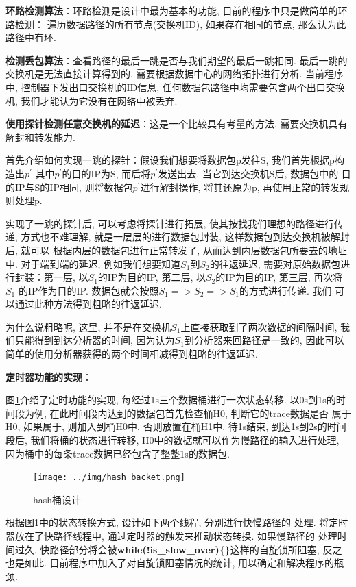 \textbf{环路检测算法}：环路检测是设计中最为基本的功能, 目前的程序中只是做简单的环路检测：
 遍历数据路径的所有节点(交换机ID), 如果存在相同的节点, 那么认为此路径中有环.

\textbf{检测丢包算法}：查看路径的最后一跳是否与我们期望的最后一跳相同.
最后一跳的交换机是无法直接计算得到的, 需要根据数据中心的网络拓扑进行分析.
当前程序中, 控制器下发出口交换机的ID信息,
任何数据包路径中均需要包含两个出口交换机, 我们才能认为它没有在网络中被丢弃.


\textbf{使用探针检测任意交换机的延迟}：这是一个比较具有考量的方法.
需要交换机具有解封和转发能力.

首先介绍如何实现一跳的探针：假设我们想要将数据包p发往S,
我们首先根据p构造出\(p^{'}\) 其中\(p^{'}\)的目的IP为S,
而后将\(p^{'}\)发送出去, 当它到达交换机S后, 数据包中的
目的IP与S的IP相同, 则将数据包\(p^{'}\)进行解封操作, 将其还原为p,
再使用正常的转发规则处理p.

实现了一跳的探针后, 可以考虑将探针进行拓展,
使其按找我们理想的路径进行传递, 方式也不难理解,
就是一层层的进行数据包封装, 这样数据包到达交换机被解封后, 就可以
根据内层的数据包进行正常转发了, 从而达到内层数据包所要去的地址中.
对于端到端的延迟, 例如我们想要知道\(S_{1}\)到\(S_{2}\)的往返延迟,
需要对原始数据包进行封装：第一层, 以\(S_{1}\)的IP为目的IP, 第二层,
以\(S_{2}\)的IP为目的IP, 第三层, 再次将\(S_{1}\) 的IP作为目的IP.
数据包就会按照\(S_{1} => S_{2} => S_{1}\)的方式进行传递. 我们
可以通过此种方法得到粗略的往返延迟.

为什么说粗略呢, 这里,
并不是在交换机\(S_{1}\)上直接获取到了两次数据的间隔时间,
我们只能得到到达分析器的时间, 因为认为\(S_{1}\)到分析器来回路径是一致的,
因此可以 简单的使用分析器获得的两个时间相减得到粗略的往返延迟.

\textbf{定时器功能的实现}：

图\ref{fig:hash_backet}介绍了定时功能的实现, 每经过1s三个数据桶进行一次状态转移.
以0s到1s的时间段为例, 在此时间段内达到的数据包首先检查桶H0, 判断它的trace数据是否
属于H0, 如果属于, 则加入到桶H0中, 否则放置在桶H1中. 待1s结束, 到达1s到2s的时间段后,
我们将桶的状态进行转移, H0中的数据就可以作为慢路径的输入进行处理,
因为桶中的每条trace数据已经包含了整整1s的数据包.

\begin{figure}[htbp!]
  \centering
  \texttt{[image: ../img/hash\_backet.png]}
  \caption{hash桶设计}
  \label{fig:hash_backet}
\end{figure}


  根据图\ref{fig:hash_backet}中的状态转换方式, 设计如下两个线程, 分别进行快慢路径的
处理. 将定时器放在了快路径线程中, 通过定时器的触发来推动状态转换. 如果慢路径的
处理时间过久, 快路径部分将会被\textbf{while(!is\_slow\_over)\{\}}这样的自旋锁所阻塞,
反之也是如此. 目前程序中加入了对自旋锁阻塞情况的统计, 用以确定和解决程序的瓶颈.

